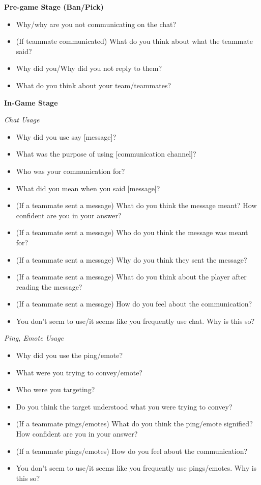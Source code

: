 \textbf{Pre-game Stage (Ban/Pick)}
\begin{itemize}
\item Why/why are you not communicating on the chat?
\item(If teammate communicated) What do you think about what the teammate said?
\item Why did you/Why did you not reply to them?
\item What do you think about your team/teammates?
\end{itemize}

\textbf{In-Game Stage}

\textit{Chat Usage}
\begin{itemize}
\item Why did you use say [message]?
\item What was the purpose of using [communication channel]?
\item Who was your communication for?
\item What did you mean when you said [message]?
\item (If a teammate sent a message) What do you think the message meant? How confident are you in your answer?
\item (If a teammate sent a message) Who do you think the message was meant for?
\item (If a teammate sent a message) Why do you think they sent the message?
\item (If a teammate sent a message) What do you think about the player after reading the message?
\item (If a teammate sent a message) How do you feel about the communication?
\item You don’t seem to use/it seems like you frequently use chat. Why is this so?
\end{itemize}
 
\textit{Ping, Emote Usage}
\begin{itemize}
\item Why did you use the ping/emote?
\item What were you trying to convey/emote?
\item Who were you targeting?
\item Do you think the target understood what you were trying to convey?
\item (If a teammate pings/emotes) What do you think the ping/emote signified? How confident are you in your answer?
\item (If a teammate pings/emotes) How do you feel about the communication?
\item You don’t seem to use/it seems like you frequently use pings/emotes. Why is this so?
\end{itemize}


